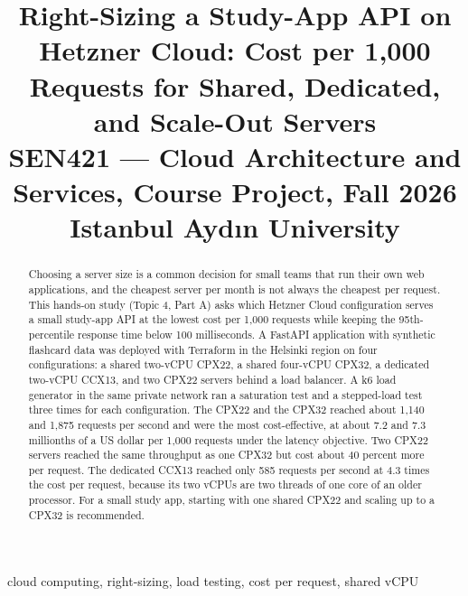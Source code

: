 \documentclass[conference,a4paper]{IEEEtran}
\begin{document}
\title{Right-Sizing a Study-App API on Hetzner Cloud: Cost per 1,000 Requests for Shared, Dedicated, and Scale-Out Servers\\
	{\footnotesize SEN421 --- Cloud Architecture and Services, Course Project, Fall 2026\\
		Istanbul Ayd\i n University}
}

\author{
}

\maketitle

\begin{abstract}
Choosing a server size is a common decision for small teams that run their own web applications, and the cheapest server per month is not always the cheapest per request. This hands-on study (Topic 4, Part A) asks which Hetzner Cloud configuration serves a small study-app API at the lowest cost per 1,000 requests while keeping the 95th-percentile response time below 100 milliseconds. A FastAPI application with synthetic flashcard data was deployed with Terraform in the Helsinki region on four configurations: a shared two-vCPU CPX22, a shared four-vCPU CPX32, a dedicated two-vCPU CCX13, and two CPX22 servers behind a load balancer. A k6 load generator in the same private network ran a saturation test and a stepped-load test three times for each configuration. The CPX22 and the CPX32 reached about 1,140 and 1,875 requests per second and were the most cost-effective, at about 7.2 and 7.3 millionths of a US dollar per 1,000 requests under the latency objective. Two CPX22 servers reached the same throughput as one CPX32 but cost about 40 percent more per request. The dedicated CCX13 reached only 585 requests per second at 4.3 times the cost per request, because its two vCPUs are two threads of one core of an older processor. For a small study app, starting with one shared CPX22 and scaling up to a CPX32 is recommended.
\end{abstract}

\begin{IEEEkeywords}
cloud computing, right-sizing, load testing, cost per request, shared vCPU
\end{IEEEkeywords}
\end{document}
